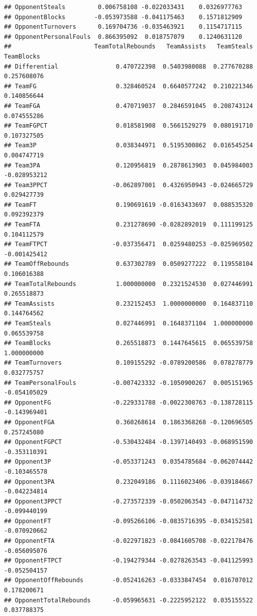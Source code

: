 \documentclass[]{book}
\begin{document}
\begin{verbatim}
## OpponentSteals         0.006758108 -0.022033431    0.0326977763
## OpponentBlocks        -0.053973588 -0.041175463    0.1571812909
## OpponentTurnovers      0.169704736 -0.035463921    0.1154717115
## OpponentPersonalFouls  0.866395092  0.018757079    0.1240631120
##                       TeamTotalRebounds   TeamAssists   TeamSteals   TeamBlocks
## Differential                0.470722398  0.5403980088  0.277670288  0.257608076
## TeamFG                      0.328460524  0.6640577242  0.210221346  0.140856644
## TeamFGA                     0.470719037  0.2846591045  0.208743124  0.074555286
## TeamFGPCT                   0.018581908  0.5661529279  0.080191710  0.107327505
## Team3P                      0.038344971  0.5195300862  0.016545254  0.004747719
## Team3PA                     0.120956819  0.2878613903  0.045984003 -0.028953212
## Team3PPCT                  -0.062897001  0.4326950943 -0.024665729  0.029427739
## TeamFT                      0.190691619 -0.0163433697  0.088535320  0.092392379
## TeamFTA                     0.231278690 -0.0282892019  0.111199125  0.104112579
## TeamFTPCT                  -0.037356471  0.0259480253 -0.025969502 -0.001425412
## TeamOffRebounds             0.637302789  0.0509277222  0.119558104  0.106016388
## TeamTotalRebounds           1.000000000  0.2321524530  0.027446991  0.265518873
## TeamAssists                 0.232152453  1.0000000000  0.164837110  0.144764562
## TeamSteals                  0.027446991  0.1648371104  1.000000000  0.065539758
## TeamBlocks                  0.265518873  0.1447645615  0.065539758  1.000000000
## TeamTurnovers               0.109155292 -0.0789200586  0.078278779  0.032775757
## TeamPersonalFouls          -0.007423332 -0.1050900267  0.005151965 -0.054105029
## OpponentFG                 -0.229331788 -0.0022308763 -0.138728115 -0.143969401
## OpponentFGA                 0.360268614  0.1863368268 -0.120696505  0.257245080
## OpponentFGPCT              -0.530432484 -0.1397140493 -0.068951590 -0.353110391
## Opponent3P                 -0.053371243  0.0354785684 -0.062074442 -0.103465578
## Opponent3PA                 0.232049186  0.1116023406 -0.039184667 -0.042234814
## Opponent3PPCT              -0.273572339 -0.0502063543 -0.047114732 -0.099440199
## OpponentFT                 -0.095266106 -0.0835716395 -0.034152581 -0.070920662
## OpponentFTA                -0.022971823 -0.0841605708 -0.022178476 -0.056095076
## OpponentFTPCT              -0.194279344 -0.0278263543 -0.041125993 -0.052504157
## OpponentOffRebounds        -0.052416263 -0.0333847454  0.016707012  0.178200671
## OpponentTotalRebounds      -0.059965631 -0.2225952122  0.035155522  0.037788375

\end{verbatim}
\end{document}
